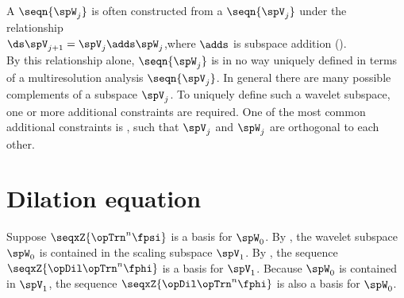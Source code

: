 
A  $\seqn{\spW_j}$ is often constructed from a  
$\seqn{\spV_j}$ under the relationship
\\\indentx$\ds\spV_{j+1} = \spV_j \adds \spW_j$,\qquad where $\adds$ is subspace addition ().\\
By this relationship alone, $\seqn{\spW_j}$ is in no way uniquely defined 
in terms of a multiresolution analysis $\seqn{\spV_j}$.
In general there are many possible complements of a subspace $\spV_j$.
To uniquely define such a wavelet subspace, one or more additional constraints are required.
One of the most common additional constraints is , such that
$\spV_j$ and $\spW_j$ are orthogonal to each other.




\section{Dilation equation}
Suppose $\seqxZ{\opTrn^n\fpsi}$ is a basis for $\spW_0$.
By , the wavelet subspace $\spW_0$ is contained in the 
scaling subspace $\spV_1$.
By , the sequence $\seqxZ{\opDil\opTrn^n\fphi}$ is a basis for $\spV_1$.
Because $\spW_0$ is contained in $\spV_1$,
the sequence $\seqxZ{\opDil\opTrn^n\fphi}$ is also a basis for $\spW_0$.

